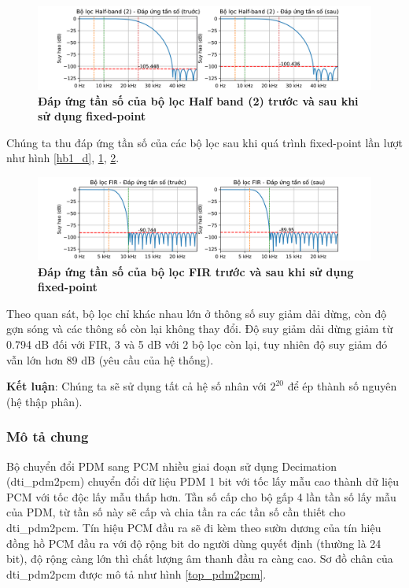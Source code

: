 \begin{figure}[H]
    \centering
    \includegraphics[width=17.5cm]{Images/Chuong4/hb2.png}
    \caption[Đáp ứng tần số của bộ lọc Half band (2) trước và sau khi sử dụng fixed-point]{\bfseries \fontsize{12pt}{0pt}\selectfont Đáp ứng tần số của bộ lọc Half band (2) trước và sau khi sử dụng fixed-point}
    \label{hb2_d}
\end{figure}
Chúng ta thu đáp ứng tần số của các bộ lọc sau khi quá trình fixed-point lần lượt như hình \ref{hb1_d}, \ref{hb2_d}, \ref{fir_d}.
\begin{figure}[H]
    \centering
    \includegraphics[width=17.5cm]{Images/Chuong4/fir.png}
    \caption[Đáp ứng tần số của bộ lọc FIR trước và sau khi sử dụng fixed-point]{\bfseries \fontsize{12pt}{0pt}\selectfont Đáp ứng tần số của bộ lọc FIR trước và sau khi sử dụng fixed-point}
    \label{fir_d}
\end{figure}



Theo quan sát, bộ lọc chỉ khác nhau lớn ở thông số suy giảm dải dừng, còn độ gợn sóng và các thông số còn lại không thay đổi. Độ suy giảm dải dừng giảm từ 0.794 dB đối với FIR, 3 và 5 dB với 2 bộ lọc còn lại, tuy nhiên độ suy giảm đó vẫn lớn hơn 89 dB (yêu cầu của hệ thống).

\textbf{Kết luận}: Chúng ta sẽ sử dụng tất cả hệ số nhân với $2^{20}$ để ép thành số nguyên (hệ thập phân).
\subsubsection{Mô tả chung}
Bộ chuyển đổi PDM sang PCM nhiều giai đoạn sử dụng Decimation (dti\_pdm2pcm) chuyển đổi dữ liệu PDM 1 bit với tốc lấy mẫu cao thành dữ liệu PCM với  tốc độc lấy mẫu thấp hơn. Tần số cấp cho bộ gấp 4 lần tần số lấy mẫu của PDM, từ tần số này sẽ cấp và chia tần ra các tần số cần thiết cho dti\_pdm2pcm. Tín hiệu PCM đầu ra sẽ đi kèm theo sườn dương của tín hiệu đồng hồ PCM đầu ra với độ rộng bit do người dùng quyết định (thường là 24 bit), độ rộng càng lớn thì chất lượng âm thanh đầu ra càng cao. Sơ đồ chân của dti\_pdm2pcm được mô tả như hình \ref{top_pdm2pcm}.

